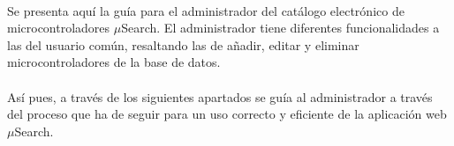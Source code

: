 \paragraph{}Se presenta aquí la guía para el administrador del catálogo electrónico de microcontroladores $\mu$Search. El administrador tiene diferentes funcionalidades a las del usuario común, resaltando las de añadir, editar y eliminar microcontroladores de la base de datos.

\paragraph{}Así pues, a través de los siguientes apartados se guía al administrador a través del proceso que ha de seguir para un uso correcto y eficiente de la aplicación web $\mu$Search.